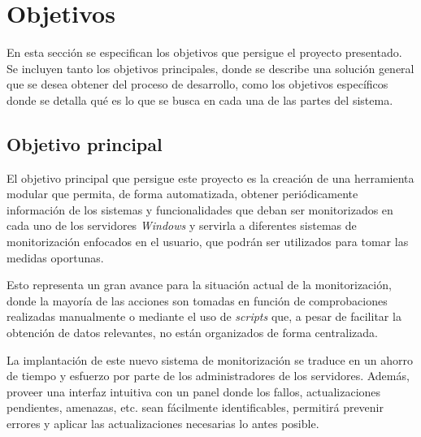 
\section{Objetivos} \label{sec:obj}
    En esta sección se especifican los objetivos que persigue el proyecto presentado. Se incluyen tanto los objetivos principales, donde se describe una solución general que se desea obtener del proceso de desarrollo, como los objetivos específicos donde se detalla qué es lo que se busca en cada una de las partes del sistema.

    \subsection{Objetivo principal}
        El objetivo principal que persigue este proyecto es la creación de una herramienta modular que permita, de forma automatizada, obtener periódicamente información de los sistemas y funcionalidades que deban ser monitorizados en cada uno de los servidores \textit{Windows} y servirla a diferentes sistemas de monitorización enfocados en el usuario, que podrán ser utilizados para tomar las medidas oportunas.
        
        Esto representa un gran avance para la situación actual de la monitorización, donde la mayoría de las acciones son tomadas en función de comprobaciones realizadas manualmente o mediante el uso de \textit{scripts} que, a pesar de facilitar la obtención de datos relevantes, no están organizados de forma centralizada.
        
        La implantación de este nuevo sistema de monitorización se traduce en un ahorro de tiempo y esfuerzo por parte de los administradores de los servidores. Además, proveer una interfaz intuitiva con un panel donde los fallos, actualizaciones pendientes, amenazas, etc. sean fácilmente identificables, permitirá prevenir errores y aplicar las actualizaciones necesarias lo antes posible.
        
